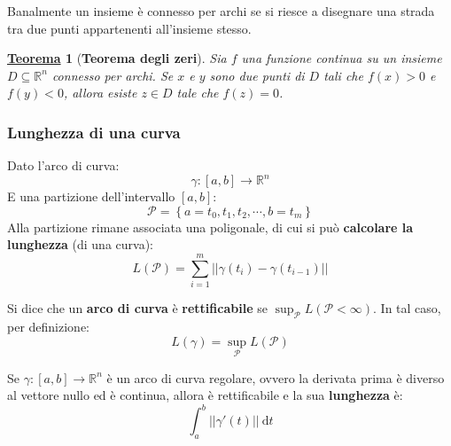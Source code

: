 \documentclass[a4paper]{article}
\newtheorem{theorem}{\textcolor{Red3}{\underline{Teorema}}}
\newcommand{\definition}[1]{\textcolor{Red3}{\textbf{#1}}}
\begin{document}
	\noindent
	Banalmente un insieme è connesso per archi se si riesce a disegnare una strada tra due punti appartenenti all'insieme stesso.

	\begin{theorem}[\textbf{Teorema degli zeri}]
		Sia $f$ una funzione continua su un insieme $D \subseteq \mathbb{R}^{n}$ connesso per archi. Se $x$ e $y$ sono due punti di $D$ tali che $f\left(x\right) > 0$ e $f\left(y\right) < 0$, allora esiste $z \in D$ tale che $f\left(z\right) = 0$.
	\end{theorem}
	
	\newpage

	\subsubsection{Lunghezza di una curva}\label{subsubsection: lunghezza di una curva}

	Dato l'arco di curva:
	\begin{equation*}
		\gamma:\left[a,b\right] \rightarrow \mathbb{R}^{n}
	\end{equation*}
	E una partizione dell'intervallo $\left[a,b\right]$:
	\begin{equation*}
		\mathcal{P} = \left\{a=t_{0}, t_{1}, t_{2}, \cdots, b = t_{m}\right\}
	\end{equation*}
	Alla partizione rimane associata una poligonale, di cui si può \textbf{calcolare la lunghezza} (di una curva):
	\begin{equation}\label{eq: lunghezza di una curva}
		L\left(\mathcal{P}\right) = \displaystyle\sum_{i=1}^{m} \left|\left| \gamma\left(t_{i}\right) - \gamma \left(t_{i-1}\right) \right|\right|
	\end{equation}

	\begin{boxdef}
		Si dice che un \definition{arco di curva} è \definition{rettificabile} se $\sup_{\mathcal{P}} L\left(\mathcal{P} < \infty\right)$. In tal caso, per definizione:
		\begin{equation*}
			L\left(\gamma\right) = \sup_{\mathcal{P}} L\left(\mathcal{P}\right)
		\end{equation*}
	\end{boxdef}

	\begin{boxdef}
		Se $\gamma : \left[a,b\right] \rightarrow \mathbb{R}^{n}$ è un arco di curva regolare, ovvero la derivata prima è diverso al vettore nullo ed è continua, allora è rettificabile e la sua \definition{lunghezza} è:
		\begin{equation}\label{eq: integrale - lunghezza di una curva}
			\displaystyle\int_{a}^{b} \left|\left| \gamma'\left(t\right) \right|\right| \: \mathrm{d}t
		\end{equation}
	\end{boxdef}
\end{document}

